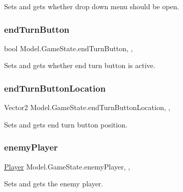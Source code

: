 Sets and gets whether drop down menu should be open. \hypertarget{class_model_1_1_game_state_ae55aa686aaf5841657344fdc178c92d5}{}\label{class_model_1_1_game_state_ae55aa686aaf5841657344fdc178c92d5} 
\subsubsection{\texorpdfstring{end\+Turn\+Button}{endTurnButton}}
{\footnotesize\ttfamily bool Model.\+Game\+State.\+end\+Turn\+Button\hspace{0.3cm}{\ttfamily [static]}, {\ttfamily [get]}, {\ttfamily [set]}}

Sets and gets whether end turn button is active. \hypertarget{class_model_1_1_game_state_ae092b0d0e2c881a590e5798fd39d7798}{}\label{class_model_1_1_game_state_ae092b0d0e2c881a590e5798fd39d7798} 
\subsubsection{\texorpdfstring{end\+Turn\+Button\+Location}{endTurnButtonLocation}}
{\footnotesize\ttfamily Vector2 Model.\+Game\+State.\+end\+Turn\+Button\+Location\hspace{0.3cm}{\ttfamily [static]}, {\ttfamily [get]}, {\ttfamily [set]}}

Sets and gets end turn button position. \hypertarget{class_model_1_1_game_state_ae276234c4a6b2b182b13f125abb61ba3}{}\label{class_model_1_1_game_state_ae276234c4a6b2b182b13f125abb61ba3} 
\subsubsection{\texorpdfstring{enemy\+Player}{enemyPlayer}}
{\footnotesize\ttfamily \hyperlink{class_model_1_1_player}{Player} Model.\+Game\+State.\+enemy\+Player\hspace{0.3cm}{\ttfamily [static]}, {\ttfamily [get]}, {\ttfamily [set]}}

Sets and gets the enemy player. \hypertarget{class_model_1_1_game_state_a32226ed0679f9e47a0e7ed4cb2ed1009}{}\label{class_model_1_1_game_state_a32226ed0679f9e47a0e7ed4cb2ed1009} 
